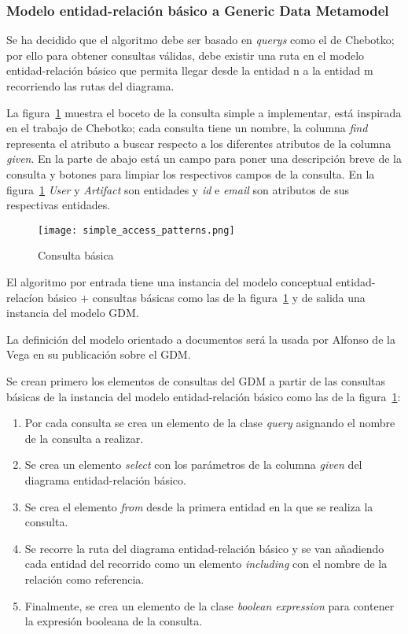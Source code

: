 \subsubsection{Modelo entidad-relación básico a Generic Data Metamodel}

Se ha decidido que el algoritmo debe ser basado en \textit{querys} como el de Chebotko; por ello para obtener consultas válidas, debe existir una ruta en el modelo entidad-relación básico que permita llegar desde la entidad n a la entidad m recorriendo las rutas del diagrama.


La figura~\ref{img:simple-access-pattern} muestra el boceto de la consulta simple a implementar, está inspirada en el trabajo de Chebotko; cada consulta tiene un nombre, la columna \textit{find} representa el atributo a buscar respecto a los diferentes atributos de la columna \textit{given}. En la parte de abajo está un campo para poner una descripción breve de la consulta y botones para limpiar los respectivos campos de la consulta. En la figura~\ref{img:simple-access-pattern} \textit{User} y \textit{Artifact} son entidades y \textit{id} e \textit{email} son atributos de sus respectivas entidades.


\begin{figure}[H] 
    \centering
    \texttt{[image: simple\_access\_patterns.png]}
    \caption{Consulta básica}
    \label{img:simple-access-pattern}
\end{figure}


El algoritmo por entrada tiene una instancia del modelo conceptual entidad-relacíon básico $+$ consultas básicas como las de la figura~\ref{img:simple-access-pattern} y de salida una instancia del modelo GDM.


La definición del modelo orientado a documentos será la usada por Alfonso de la Vega en su publicación sobre el GDM.


Se crean primero los elementos de consultas del GDM a partir de las consultas básicas de la instancia del modelo entidad-relación básico como las de la figura~\ref{img:simple-access-pattern}:


\begin{enumerate}
    \item Por cada consulta se crea un elemento de la clase \textit{query} asignando el nombre de la consulta a realizar.
    \item Se crea un elemento \textit{select} con los parámetros de la columna \textit{given} del diagrama entidad-relación básico.
    \item Se crea el elemento \textit{from} desde la primera entidad en la que se realiza la consulta.
    \item Se recorre la ruta del diagrama entidad-relación básico y se van añadiendo cada entidad del recorrido como un elemento \textit{including} con el nombre de la relación como referencia.
    \item Finalmente, se crea un elemento de la clase \textit{boolean expression} para contener la expresión booleana de la consulta.
\end{enumerate}


